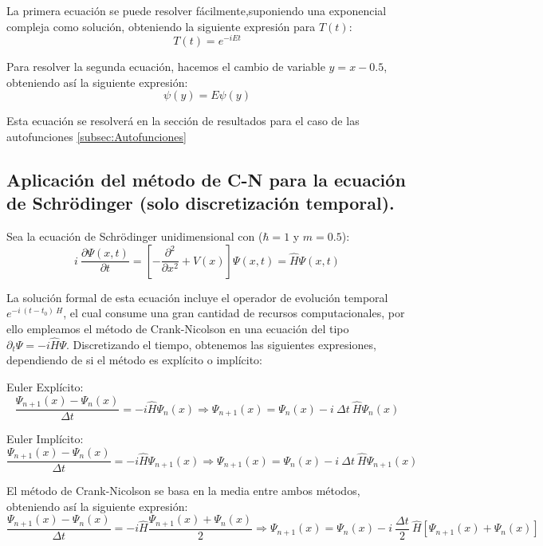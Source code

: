 \documentclass[10pt,onecolumn]{article}
\begin{document}
La primera ecuación se puede resolver fácilmente,suponiendo una exponencial compleja como solución, obteniendo la siguiente expresión para $T(t)$:
\begin{equation}
    T(t) = e^{-i E t}
\end{equation}

Para resolver la segunda ecuación, hacemos el cambio de variable $y = x - 0.5$, obteniendo así la siguiente expresión:
\begin{equation}
    [-\dfrac{d^2}{dy ^2} + \dfrac{\omega^2}{4}\ y^2]\psi(y) = E\psi(y) 
\end{equation}

Esta ecuación se resolverá en la sección de resultados para el caso de las autofunciones \ref{subsec:Autofunciones}


\subsection{Aplicación del método de C-N para la ecuación de Schrödinger (solo discretización temporal).}

Sea la ecuación de Schrödinger unidimensional con ($\hbar = 1$ y $m = 0.5$):
\begin{equation}
    i\ \dfrac{\partial \Psi(x,t)}{\partial t} = [-\dfrac{\partial^2}{\partial x ^2} + V(x)]\Psi(x,t) = \hat{H} \Psi(x,t)
\end{equation}

La solución formal de esta ecuación incluye el operador de evolución temporal $e^{-i\ (t-t_0)\  H}$, el cual consume una gran cantidad de recursos computacionales, por ello empleamos el método de Crank-Nicolson en una ecuación del tipo $\partial_t \Psi = -i \hat{H}\Psi$. Discretizando el tiempo, obtenemos las siguientes expresiones, dependiendo de si el método es explícito o implícito:

Euler Explícito:
\begin{equation}
    \dfrac{\Psi_{n+1}(x) - \Psi_n(x)}{\Delta t} = -i \hat{H} \Psi_n(x) \Rightarrow \Psi_{n+1}(x) = \Psi_n(x) - i\ \Delta t\ \hat{H} \Psi_n(x)
\end{equation}

Euler Implícito:
\begin{equation}
    \dfrac{\Psi_{n+1}(x) - \Psi_n(x)}{\Delta t} = -i \hat{H} \Psi_{n+1}(x) \Rightarrow \Psi_{n+1}(x) = \Psi_n(x) - i\ \Delta t\ \hat{H} \Psi_{n+1}(x)
\end{equation}

El método de Crank-Nicolson se basa en la media entre ambos métodos, obteniendo así la siguiente expresión:
\begin{equation}
    \dfrac{\Psi_{n+1}(x) - \Psi_n(x)}{\Delta t} = -i \hat{H} \dfrac{\Psi_{n+1}(x) + \Psi_n(x)}{2} \Rightarrow \Psi_{n+1}(x) = \Psi_n(x) - i\ \dfrac{\Delta t}{2}\ \hat{H} [\Psi_{n+1}(x) + \Psi_n(x)]
\end{equation}
\end{document}
